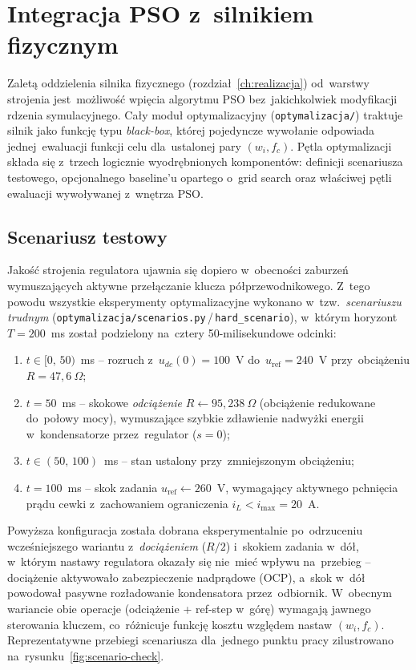 \section{Integracja PSO z~silnikiem fizycznym}
\label{sec:pso-integration}

Zaletą oddzielenia silnika fizycznego (rozdział~\ref{ch:realizacja}) od~warstwy strojenia jest~możliwość wpięcia algorytmu PSO bez~jakichkolwiek modyfikacji rdzenia symulacyjnego. Cały moduł optymalizacyjny (\texttt{optymalizacja/}) traktuje silnik jako funkcję typu \emph{black-box}, której pojedyncze wywołanie odpowiada jednej~ewaluacji funkcji celu dla~ustalonej pary $(w_i, f_c)$. Pętla optymalizacji składa się z~trzech logicznie wyodrębnionych komponentów: definicji scenariusza testowego, opcjonalnego baseline'u opartego o~grid search oraz właściwej pętli ewaluacji wywoływanej z~wnętrza PSO.

\subsection{Scenariusz testowy}
\label{subsec:pso-scenario}

Jakość strojenia regulatora ujawnia się dopiero w~obecności zaburzeń wymuszających aktywne przełączanie klucza półprzewodnikowego. Z~tego powodu wszystkie eksperymenty optymalizacyjne wykonano w~tzw.~\emph{scenariuszu trudnym} (\texttt{optymalizacja/scenarios.py}\,/\,\texttt{hard\_scenario}), w~którym horyzont $T = 200$~ms został podzielony na~cztery 50-milisekundowe odcinki:
\begin{enumerate}
    \item $t\in[0,\,50)$~ms -- rozruch z~$u_{dc}(0)=100$~V do~$u_{\mathrm{ref}}=240$~V przy~obciążeniu $R = 47{,}6~\Omega$;
    \item $t = 50$~ms -- skokowe \emph{odciążenie} $R \leftarrow 95{,}238~\Omega$ (obciążenie redukowane do~połowy mocy), wymuszające szybkie zdławienie nadwyżki energii w~kondensatorze przez~regulator ($s = 0$);
    \item $t\in(50,\,100)$~ms -- stan ustalony przy~zmniejszonym obciążeniu;
    \item $t = 100$~ms -- skok zadania $u_{\mathrm{ref}} \leftarrow 260$~V, wymagający aktywnego pchnięcia prądu cewki z~zachowaniem ograniczenia $i_L < i_{\max} = 20$~A.
\end{enumerate}
Powyższa konfiguracja została dobrana eksperymentalnie po~odrzuceniu wcześniejszego wariantu z~\emph{dociążeniem} ($R/2$) i~skokiem zadania w~dół, w~którym nastawy regulatora okazały się nie~mieć wpływu na~przebieg -- dociążenie aktywowało zabezpieczenie nadprądowe (OCP), a~skok w~dół powodował pasywne rozładowanie kondensatora przez~odbiornik. W~obecnym wariancie obie operacje (odciążenie + ref-step w~górę) wymagają jawnego sterowania kluczem, co~różnicuje funkcję kosztu względem nastaw $(w_i, f_c)$. Reprezentatywne przebiegi scenariusza dla~jednego punktu pracy zilustrowano na~rysunku~\ref{fig:scenario-check}.

